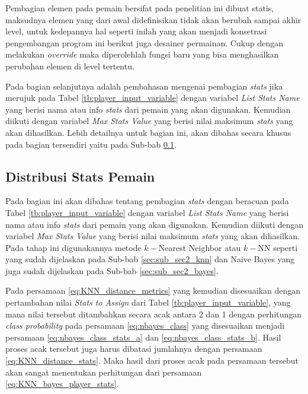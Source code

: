 Pembagian elemen pada pemain bersifat pada penelitian ini dibuat statis, maksudnya elemen yang dari awal didefinisikan tidak akan berubah sampai akhir level, untuk kedepannya hal seperti inilah yang akan menjadi konsetrasi pengembangan program ini berikut juga desainer permainan. Cukup dengan melakukan \textit{override} maka diperolehlah fungsi baru yang bisa menghasilkan perubahan elemen di level tertentu.
\vspace{1ex}

Pada bagian selanjutnya adalah pembahasan mengenai pembagian \textit{stats} jika merujuk pada Tabel \ref{tb:player_input_variable} dengan variabel \textit{List Stats Name} yang berisi nama atau info \textit{stats} dari pemain yang akan digunakan. Kemudian diikuti dengan variabel \textit{Max Stats Value} yang berisi nilai maksimum \textit{stats} yang akan dihasilkan. Lebih detailnya untuk bagian ini, akan dibahas secara khusus pada bagian tersendiri yaitu pada Sub-bab \ref{sec:sub_sec3_stat_pemain}.
\vspace{1ex}

\subsection{Distribusi Stats Pemain}
\label{sec:sub_sec3_stat_pemain}
\vspace{1ex}

Pada bagian ini akan dibahas tentang pembagian \textit{stats} dengan beracuan pada Tabel \ref{tb:player_input_variable} dengan variabel \textit{List Stats Name} yang berisi nama atau info \textit{stats} dari pemain yang akan digunakan. Kemudian diikuti dengan variabel \textit{Max Stats Value} yang berisi nilai maksimum \textit{stats} yang akan dihasilkan. Pada tahap ini digunakannya metode $k-$Nearest Neighbor atau $k-$NN seperti yang sudah dijelaskan pada Sub-bab \ref{sec:sub_sec2_knn} dan Naive Bayes yang juga sudah dijelaskan pada Sub-bab \ref{sec:sub_sec2_bayes}. 
\vspace{1ex}

Pada persamaan \ref{eq:KNN_distance_metrics} yang kemudian disesuaikan dengan pertambahan nilai \textit{Stats to Assign} dari Tabel \ref{tb:player_input_variable}, yang mana nilai tersebut ditambahkan secara acak antara 2 dan 1 dengan perhitungan \textit{class probability} pada persamaan \ref{eq:nbayes_class} yang disesuaikan menjadi persamaan \ref{eq:nbayes_class_stats_a} dan \ref{eq:nbayes_class_stats_b}. Hasil proses acak tersebut juga harus dibatasi jumlahnya dengan persamaan \ref{eq:KNN_distance_stats}. Maka hasil dari proses acak pada persamaan tersebut akan sangat menentukan perhitungan dari persamaan \ref{eq:KNN_bayes_player_stats}.
\vspace{1ex}

